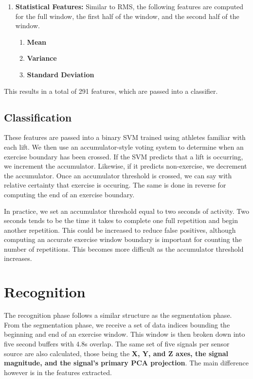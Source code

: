 \begin{enumerate}
\begin{enumerate}
    \end{enumerate}
    \item \textbf{Statistical Features:} Similar to RMS, the following features are computed for the full window, the first half of the window, and the second half of the window. 
    \begin{enumerate}
        \item \textbf{Mean} 
        \item \textbf{Variance}
        \item \textbf{Standard Deviation}
    \end{enumerate}
\end{enumerate}

This results in a total of 291 features, which are passed into a classifier. 

\subsection{Classification}
These features are passed into a binary SVM trained using athletes familiar with each lift. We then use an accumulator-style voting system to determine when an exercise boundary has been crossed. If the SVM predicts that a lift is occurring, we increment the accumulator. Likewise, if it predicts non-exercise, we decrement the accumulator. Once an accumulator threshold is crossed, we can say with relative certainty that exercise is occuring. The same is done in reverse for computing the end of an exercise boundary.

In practice, we set an accumulator threshold equal to two seconds of activity. Two seconds tends to be the time it takes to complete one full repetition and begin another repetition. This could be increased to reduce false positives, although computing an accurate exercise window boundary is important for counting the number of repetitions. This becomes more difficult as the accumulator threshold increases.

\section{Recognition}

The recognition phase follows a similar structure as the segmentation phase. From the segmentation phase, we receive a set of data indices bounding the beginning and end of an exercise window. This window is then broken down into five second buffers with 4.8s overlap. The same set of five signals per sensor source are also calculated, those being the \textbf{X, Y, and Z axes, the signal magnitude, and the signal's primary PCA projection}. The main difference however is in the features extracted.

